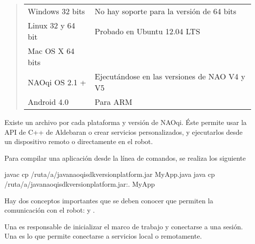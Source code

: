 \begin{quote}

\begin{savenotes}\sphinxattablestart
\centering
{}
\sphinxaftercaption

\begin{tabulary}{\linewidth}[t]{|T|T|}
\hline
{}\relax &\relax \\
\hline
Windows 32 bits
&
No hay soporte para la versión de 64 bits
\\
\hline
Linux 32 y 64 bit
&
Probado en Ubuntu 12.04 LTS
\\
\hline
Mac OS X 64 bits
&\\
\hline
NAOqi OS 2.1 +
&
Ejecutándose en las versiones de NAO V4 y V5
\\
\hline
Android 4.0
&
Para ARM
\\
\hline
\end{tabulary}
\par
\sphinxattableend\end{savenotes}
\end{quote}

Existe un archivo  por cada plataforma y versión de NAOqi. Éste
permite usar la API de C++ de Aldebaran o crear servicios
personalizados, y ejecutarlos desde un dispositivo remoto o directamente en el
robot.

Para compilar una aplicación desde la línea de comandos, se realiza los
siguiente

\begin{sphinxVerbatim}[commandchars=\\\{\}]
javac \PYGZhy{}cp /ruta/a/java\PYGZhy{}naoqi\PYGZhy{}sdk\PYGZhy{}\PYGZlt{}version\PYGZgt{}\PYGZhy{}\PYGZlt{}platform\PYGZgt{}.jar MyApp.java
java \PYGZhy{}cp /ruta/a/java\PYGZhy{}naoqi\PYGZhy{}sdk\PYGZhy{}\PYGZlt{}version\PYGZgt{}\PYGZhy{}\PYGZlt{}platform\PYGZgt{}.jar:. MyApp
\end{sphinxVerbatim}

Hay dos conceptos importantes que se deben conocer que permiten la comunicación
con el robot:  y .

Una  es responsable de inicializar el marco de trabajo
y conectarse a una sesión. Una  es lo que permite conectarse a
servicios local o remotamente.

